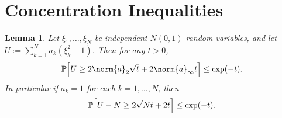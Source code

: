 \documentclass{article}
\newcommand{\1}{\mathbf{1}}
\newcommand{\Pbb}{\mathbb{P}}
\theoremstyle{alden}
\theoremstyle{aldenthm}
\newtheorem{lemma}{Lemma}
\theoremstyle{definition}
\theoremstyle{remark}
\begin{document}
\section{Concentration Inequalities}
\begin{lemma}
	\label{lem:chi_square_bound}
	Let $\xi_1,\ldots,\xi_N$ be independent $N(0,1)$ random variables, and let $U := \sum_{k = 1}^{N} a_k(\xi_k^2 - 1)$.  Then for any $t > 0$,
	\begin{equation*}
	\Pbb\Bigl[U \geq 2 \norm{a}_2 \sqrt{t} + 2 \norm{a}_{\infty}t\Bigr] \leq \exp(-t).
	\end{equation*}
	In particular if $a_k = 1$ for each $k = 1,\ldots,N$, then
	\begin{equation*}
	\Pbb\Bigl[U - N \geq 2\sqrt{N t} + 2t\Bigr] \leq \exp(-t).
	\end{equation*}
\end{lemma}


 
\end{document}
